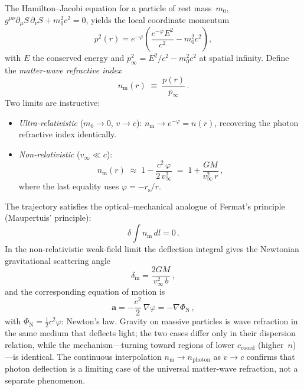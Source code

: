 \documentclass[aps,prd,onecolumn,superscriptaddress,nofootinbib,showpacs,12pt]{revtex4-2}
\newcommand{\rs}{r_{\mathrm{s}}}
\begin{document}
The Hamilton--Jacobi equation for a particle of rest
mass~$m_{0}$,
$g^{\mu\nu}\partial_{\mu}S\,\partial_{\nu}S
 + m_{0}^{2}c^{2} = 0$,
yields the local coordinate momentum
\begin{equation}\label{eq:p2_HJ}
  p^{2}(r) = e^{-\varphi}\!\left(
    \frac{e^{-\varphi}E^{2}}{c^{2}}
    - m_{0}^{2}c^{2}\right),
\end{equation}
with $E$ the conserved energy and $p_{\infty}^{2}
= E^{2}/c^{2} - m_{0}^{2}c^{2}$ at spatial infinity.
Define the \emph{matter-wave refractive index}
\begin{equation}\label{eq:n_matter}
  n_{\mathrm{m}}(r) \;\equiv\; \frac{p(r)}{p_{\infty}}\,.
\end{equation}
Two limits are instructive:
\begin{itemize}
\item \emph{Ultra-relativistic} ($m_{0}\to 0$,
  $v\to c$): \; $n_{\mathrm{m}}\to e^{-\varphi} = n(r)$,
  recovering the photon refractive index identically.
\item \emph{Non-relativistic} ($v_{\infty}\ll c$):
\begin{equation}\label{eq:n_matter_NR}
  n_{\mathrm{m}}(r) \;\approx\; 1
    - \frac{c^{2}\,\varphi}{2\,v_{\infty}^{2}}
  \;=\; 1 + \frac{GM}{v_{\infty}^{2}\,r}\,,
\end{equation}
where the last equality uses
$\varphi = -\rs/r$.
\end{itemize}
The trajectory satisfies the optical--mechanical analogue
of Fermat's principle (Maupertuis' principle):
\begin{equation}\label{eq:maupertuis}
  \delta\!\int n_{\mathrm{m}}\,dl = 0\,.
\end{equation}
In the non-relativistic weak-field limit the deflection
integral gives the Newtonian gravitational scattering
angle
\begin{equation}\label{eq:defl_matter}
  \delta_{\mathrm{m}}
  = \frac{2GM}{v_{\infty}^{2}\,b}\,,
\end{equation}
and the corresponding equation of motion is
\begin{equation}\label{eq:accel_refraction}
  \mathbf{a} = -\frac{c^{2}}{2}\,\nabla\varphi
  = -\nabla\Phi_{\mathrm{N}}\,,
\end{equation}
with $\Phi_{\mathrm{N}} = \tfrac{1}{2}c^{2}\varphi$:
Newton's law.  Gravity on massive particles is wave
refraction in the same medium that deflects light; the two
cases differ only in their dispersion relation, while the
mechanism---turning toward regions of lower
$c_{\mathrm{coord}}$ (higher~$n$)---is identical.  The
continuous interpolation
$n_{\mathrm{m}} \to n_{\mathrm{photon}}$ as $v\to c$
confirms that photon deflection is a limiting case of the
universal matter-wave refraction, not a separate
phenomenon.
\end{document}

